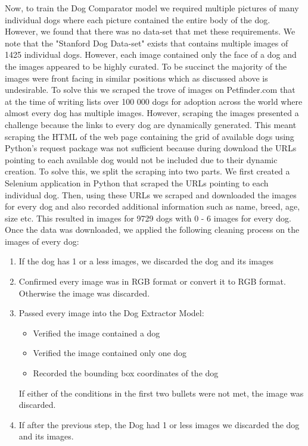 \documentclass{article}
\begin{document}
Now, to train the Dog Comparator model we required multiple pictures of many individual dogs where each picture contained the entire body of the dog.  However, we found that there was no data-set that met these requirements.  We note that the "Stanford Dog Data-set" exists that contains multiple images of 1425 individual dogs.  However, each image contained only the face of a dog and the images appeared to be highly curated.  To be succinct the majority of the images were front facing in similar positions which as discussed above is undesirable.  To solve this we scraped the trove of images on Petfinder.com that at the time of writing lists over 100 000 dogs for adoption across the world where almost every dog has multiple images.  However, scraping the images presented a challenge because the links to every dog are dynamically generated.  This meant scraping the HTML of the web page containing the grid of available dogs using Python's request package was not sufficient because during download the URLs pointing to each available dog would not be included due to their dynamic creation.  To solve this, we split the scraping into two parts.  We first created a Selenium application in Python that scraped the URLs pointing to each individual dog.  Then, using these URLs we scraped and downloaded the images for every dog and also recorded additional information such as name, breed, age, size etc.  This resulted in images for 9729 dogs with 0 - 6 images for every dog.  Once the data was downloaded, we applied the following cleaning process on the images of every dog:
\begin{enumerate}
  
  \item If the dog has 1 or a less images, we discarded the dog and its images
  
  \item Confirmed every image was in RGB format or convert it to RGB format.  Otherwise the image was discarded.
  
  \item Passed every image into the Dog Extractor Model:
    \begin{itemize}
      \item Verified the image contained a dog
      \item Verified the image contained only one dog
      \item Recorded the bounding box coordinates of the dog
    \end{itemize}
    If either of the conditions in the first two bullets were not met, the image was discarded.
    
  \item If after the previous step, the Dog had 1 or less images we discarded the dog and its images.
  
\end{enumerate}
\end{document}
